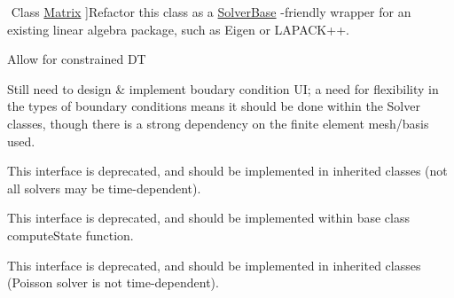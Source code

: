 \begin{DoxyRefList}
$$%
Class \mbox{\hyperlink{class_matrix}{Matrix}} ]Refactor this class as a \mbox{\hyperlink{class_solver_base}{Solver\+Base}} -\/friendly wrapper for an existing linear algebra package, such as Eigen or L\+A\+P\+A\+C\+K++.  
\item[\label{todo__todo000007}%
\Hypertarget{todo__todo000007}%
Class \mbox{\hyperlink{class_mesh}{Mesh}} ]Allow for constrained DT  
\item[\label{todo__todo000010}%
\Hypertarget{todo__todo000010}%
Class \mbox{\hyperlink{class_solver_base}{Solver\+Base}} ]Still need to design \& implement boudary condition UI; a need for flexibility in the types of boundary conditions means it should be done within the Solver classes, though there is a strong dependency on the finite element mesh/basis used.  
\item[\label{todo__todo000011}%
\Hypertarget{todo__todo000011}%
Member \mbox{\hyperlink{class_solver_base_af2c51a926b461351926101b11cc6b60a}{Solver\+Base\+:\+:integrate\+In\+Time}} (void)=0]This interface is deprecated, and should be implemented in inherited classes (not all solvers may be time-\/dependent).  
\item[\label{todo__todo000012}%
\Hypertarget{todo__todo000012}%
Member \mbox{\hyperlink{class_solver_euler_a64caa7276a35f9e5408bec75bc2d3189}{Solver\+Euler\+:\+:integrate\+In\+Time}} (double current\+Time, double dt)]This interface is deprecated, and should be implemented within base class\textquotesingle{} compute\+State function.  
\item[\label{todo__todo000013}%
\Hypertarget{todo__todo000013}%
Member \mbox{\hyperlink{class_solver_poisson_a4ff8a1c96b933bc01fdd411d3ae45f20}{Solver\+Poisson\+:\+:integrate\+In\+Time}} (void)]This interface is deprecated, and should be implemented in inherited classes (Poisson solver is not time-\/dependent). 
\end{DoxyRefList}